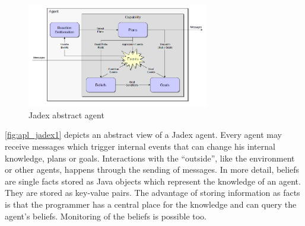 \begin{figure}
	\centering
	\includegraphics[width=300px]{images/Jadex_agent.png}
	\caption{Jadex abstract agent~\cite{pokahr_jadex_2005}}
	\label{fig:apl_jadex1}
\end{figure}
\autoref{fig:apl_jadex1} depicts an abstract view of a Jadex agent.
Every agent may receive messages which trigger internal events that can change his internal knowledge, plans or goals.
Interactions with the \enquote{outside}, like the environment or other agents, happens through the sending of messages. %
In more detail, beliefs are single facts stored as Java objects which represent the knowledge of an agent.
They are stored as key-value pairs.
The advantage of storing information as facts is that the programmer has a central place for the knowledge and can query the agent's beliefs. %
Monitoring of the beliefs is possible too.

